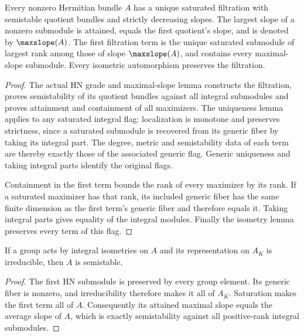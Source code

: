 \begin{lemma}
\label{lem:hn-filtration}
\leanok
Every nonzero Hermitian bundle $A$ has a unique saturated filtration with
semistable quotient bundles and strictly decreasing slopes. The largest
slope of a nonzero submodule is attained, equals the first quotient's
slope, and is denoted by $\maxslope(A)$. The first filtration term is
the unique saturated submodule of largest rank among those of slope $\maxslope(A)$,
and contains every maximal-slope submodule.
Every isometric automorphism preserves the filtration.
\end{lemma}
\begin{proof}
The actual HN grade and maximal-slope lemma constructs the filtration,
proves semistability of its quotient bundles against all integral
submodules and proves attainment and containment of all maximizers.
The uniqueness lemma applies to any saturated integral flag: localization
is monotone and preserves strictness, since a saturated submodule is
recovered from its generic fiber by taking its integral part. The degree,
metric and semistability data of each term are thereby exactly those of
the associated generic flag. Generic uniqueness and taking integral
parts identify the original flags.

Containment in the first term bounds the rank of every maximizer by its
rank. If a saturated maximizer has that rank, its included generic fiber
has the same finite dimension as the first term's generic fiber and
therefore equals it. Taking integral parts gives equality of the integral
modules. Finally the isometry lemma preserves every term of this flag.
\end{proof}

\begin{lemma}
\label{lem:irreducible-semistable}
\leanok
If a group acts by integral isometries on $A$ and its representation on
$A_K$ is irreducible, then $A$ is semistable.
\end{lemma}
\begin{proof}
The first HN submodule is preserved by every group element. Its generic
fiber is nonzero, and irreducibility therefore makes it all of $A_K$.
Saturation makes the first term all of $A$. Consequently its attained
maximal slope equals the average slope of $A$, which is exactly
semistability against all positive-rank integral submodules.
\end{proof}

